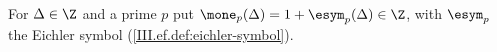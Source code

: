 For $\Delta\in\Z$ and a prime $p$ put $\mone_p(\Delta)=1+\esym_p(\Delta)\in\Z$, with $\esym_p$ the Eichler symbol (\cref{III.ef.def:eichler-symbol}).
